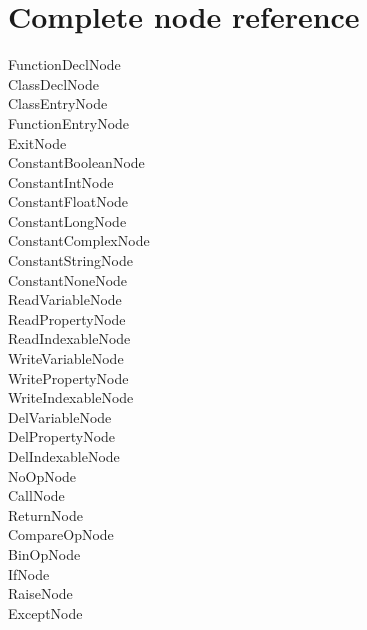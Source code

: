 \chapter{Complete node reference}

FunctionDeclNode  \\
ClassDeclNode 	 \\
ClassEntryNode\\
FunctionEntryNode\\
ExitNode\\
ConstantBooleanNode\\
ConstantIntNode\\
ConstantFloatNode\\
ConstantLongNode\\
ConstantComplexNode\\
ConstantStringNode\\
ConstantNoneNode  \\
ReadVariableNode  \\
ReadPropertyNode  \\
ReadIndexableNode  \\
WriteVariableNode  \\
WritePropertyNode  \\
WriteIndexableNode  \\
DelVariableNode  \\
DelPropertyNode  \\
DelIndexableNode  \\
NoOpNode \\ 
CallNode  \\
ReturnNode  \\
CompareOpNode  \\
BinOpNode  \\
IfNode  \\
RaiseNode  \\
ExceptNode 